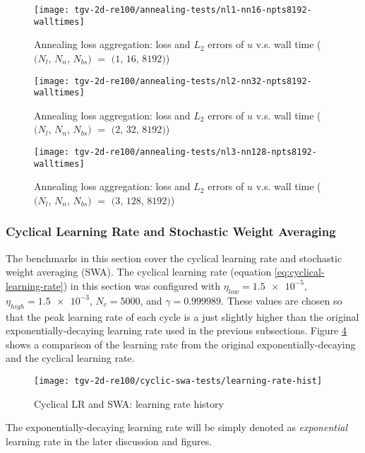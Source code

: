 \begin{figure}[hbt!]
    \centering%
    \texttt{[image: tgv-2d-re100/annealing-tests/nl1-nn16-npts8192-walltimes]}%
    \caption[%
        Annealing loss aggregation: loss and $L_2$ errors of $u$ v.s. wall time ($(N_l$, $N_n$, $N_{bs})$ $=$ $(1$, $16$, $8192)$)%
    ]{%
        Annealing loss aggregation: loss and $L_2$ errors of $u$ v.s. wall time ($(N_l$, $N_n$, $N_{bs})$ $=$ $(1$, $16$, $8192)$)%
    }\label{fig:annealing-tests-nl1-nn16-npts8192-walltimes}%
\end{figure}

\begin{figure}[hbt!]
    \centering%
    \texttt{[image: tgv-2d-re100/annealing-tests/nl2-nn32-npts8192-walltimes]}%
    \caption[%
        Annealing loss aggregation: loss and $L_2$ errors of $u$ v.s. wall time ($(N_l$, $N_n$, $N_{bs})$ $=$ $(2$, $32$, $8192)$)%
    ]{%
        Annealing loss aggregation: loss and $L_2$ errors of $u$ v.s. wall time ($(N_l$, $N_n$, $N_{bs})$ $=$ $(2$, $32$, $8192)$)%
    }\label{fig:annealing-tests-nl2-nn32-npts8192-walltimes}%
\end{figure}

\begin{figure}[hbt!]
    \centering%
    \texttt{[image: tgv-2d-re100/annealing-tests/nl3-nn128-npts8192-walltimes]}%
    \caption[%
        Annealing loss aggregation: loss and $L_2$ errors of $u$ v.s. wall time ($(N_l$, $N_n$, $N_{bs})$ $=$ $(3$, $128$, $8192)$)%
    ]{%
        Annealing loss aggregation: loss and $L_2$ errors of $u$ v.s. wall time ($(N_l$, $N_n$, $N_{bs})$ $=$ $(3$, $128$, $8192)$)%
    }\label{fig:annealing-tests-nl3-nn128-npts8192-walltimes}%
\end{figure}

\subsubsection{Cyclical Learning Rate and Stochastic Weight Averaging}

The benchmarks in this section cover the cyclical learning rate and stochastic weight averaging (SWA).
The cyclical learning rate (equation \eqref{eq:cyclical-learning-rate}) in this section was configured with $\eta_{low}=\num{1.5e-5}$, $\eta_{high}=\num{1.5e-3}$, $N_c=5000$, and $\gamma=0.999989$.
These values are chosen so that the peak learning rate of each cycle is a just slightly higher than the original exponentially-decaying learning rate used in the previous subsections.
Figure \ref{fig:cyclic-swa-tests-lr-hist} shows a comparison of the learning rate from the original exponentially-decaying and the cyclical learning rate.
\begin{figure}[hbt!]
    \centering%
    \texttt{[image: tgv-2d-re100/cyclic-swa-tests/learning-rate-hist]}%
    \caption[%
        Cyclical LR and SWA: learning rate history%
    ]{%
        Cyclical LR and SWA: learning rate history%
    }\label{fig:cyclic-swa-tests-lr-hist}%
\end{figure}
The exponentially-decaying learning rate will be simply denoted as {\it exponential} learning rate in the later discussion and figures.

